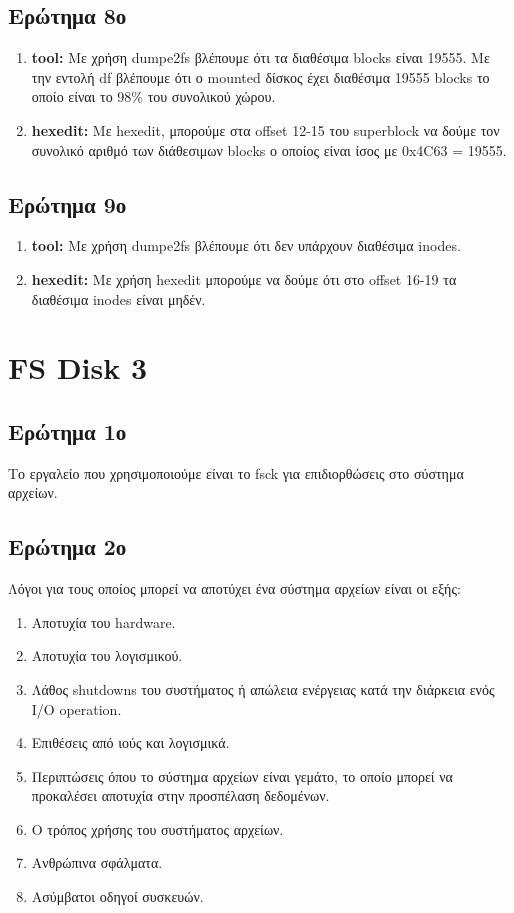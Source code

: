 \documentclass{article}
\begin{document}
\begin{enumerate}
\subsection{Ερώτημα 8ο}
\begin{enumerate}
    \item{\textbf{tool: }Με χρήση dumpe2fs βλέπουμε ότι τα διαθέσιμα blocks είναι 19555. 
        Με την εντολή df βλέπουμε ότι ο mounted δίσκος έχει διαθέσιμα 19555 blocks το οποίο είναι το
        98\% του συνολικού χώρου.\\}
    \item{\textbf{hexedit: }Με hexedit, μπορούμε στα offset 12-15 του superblock να δούμε τον συνολικό 
        αριθμό των διάθεσιμων blocks ο οποίος είναι ίσος με 0x4C63 = 19555.\\}
\end{enumerate}

\subsection{Ερώτημα 9ο}
\begin{enumerate}
    \item{\textbf{tool: }Με χρήση dumpe2fs βλέπουμε ότι δεν υπάρχουν διαθέσιμα inodes.\\}
    \item{\textbf{hexedit: }Με χρήση hexedit μπορούμε να δούμε ότι στο offset 16-19 τα
        διαθέσιμα inodes είναι μηδέν.\\}
\end{enumerate}
\pagebreak

\section{FS Disk 3}
\subsection{Ερώτημα 1ο}
Το εργαλείο που χρησιμοποιούμε είναι το fsck για επιδιορθώσεις στο σύστημα αρχείων.\\
\subsection{Ερώτημα 2ο}
Λόγοι για τους οποίος μπορεί να αποτύχει ένα σύστημα αρχείων είναι οι εξής:
\begin{enumerate}
    \item{Αποτυχία του hardware.}
    \item{Αποτυχία του λογισμικού.}
    \item{Λάθος shutdowns του συστήματος ή απώλεια ενέργειας κατά την διάρκεια ενός I/O operation.}
    \item{Επιθέσεις από ιούς και λογισμικά.}
    \item{Περιπτώσεις όπου το σύστημα αρχείων είναι γεμάτο, το οποίο μπορεί να 
        προκαλέσει αποτυχία στην προσπέλαση δεδομένων.}
    \item{Ο τρόπος χρήσης του συστήματος αρχείων.}
    \item{Ανθρώπινα σφάλματα.}
    \item{Ασύμβατοι οδηγοί συσκευών.}
\end{enumerate}


\end{enumerate}
\end{document}
